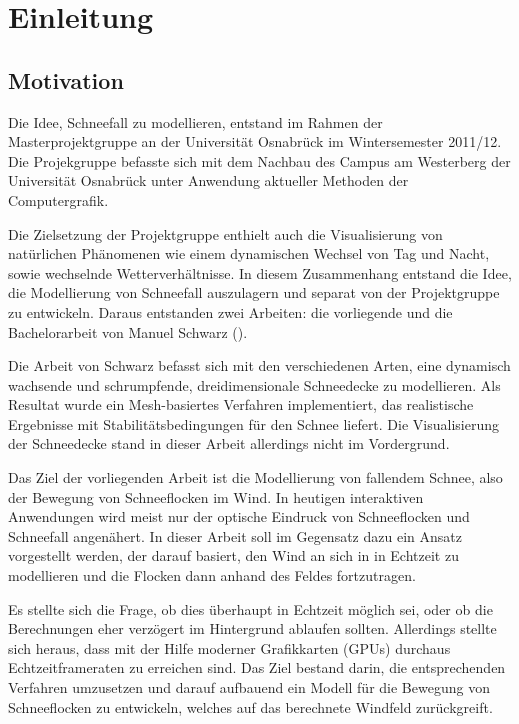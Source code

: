 \section{Einleitung}

\subsection{Motivation}

Die Idee, Schneefall zu modellieren, entstand im Rahmen der
Masterprojektgruppe  an der
Universität Osnabrück im Wintersemester 2011/12. Die Projekgruppe
befasste sich mit dem Nachbau des Campus am Westerberg der Universität
Osnabrück unter Anwendung aktueller Methoden der Computergrafik.

Die Zielsetzung der Projektgruppe enthielt auch die Visualisierung von
natürlichen Phänomenen wie einem dynamischen Wechsel von Tag und
Nacht, sowie wechselnde Wetterverhältnisse. In diesem Zusammenhang
entstand die Idee, die Modellierung von Schneefall auszulagern und
separat von der Projektgruppe zu entwickeln. Daraus entstanden zwei
Arbeiten: die vorliegende und die Bachelorarbeit von Manuel Schwarz
(\cite{Schwarz2012}).

Die Arbeit von Schwarz befasst sich mit den verschiedenen Arten, eine
dynamisch wachsende und schrumpfende, dreidimensionale Schneedecke zu
modellieren. Als Resultat wurde ein Mesh-basiertes Verfahren
implementiert, das realistische Ergebnisse mit Stabilitätsbedingungen
für den Schnee liefert. Die Visualisierung der Schneedecke stand in
dieser Arbeit allerdings nicht im Vordergrund.

Das Ziel der vorliegenden Arbeit ist die Modellierung von fallendem
Schnee, also der Bewegung von Schneeflocken im Wind. In heutigen
interaktiven Anwendungen wird meist nur der optische Eindruck von
Schneeflocken und Schneefall angenähert. In dieser Arbeit soll im
Gegensatz dazu ein Ansatz vorgestellt werden, der darauf basiert, den
Wind an sich in in Echtzeit zu modellieren und die Flocken dann anhand
des Feldes fortzutragen.

Es stellte sich die Frage, ob dies überhaupt in Echtzeit möglich sei,
oder ob die Berechnungen eher verzögert im Hintergrund ablaufen
sollten. Allerdings stellte sich heraus, dass mit der Hilfe moderner
Grafikkarten (GPUs) durchaus Echtzeitframeraten zu erreichen sind. Das
Ziel bestand darin, die entsprechenden Verfahren umzusetzen und darauf
aufbauend ein Modell für die Bewegung von Schneeflocken zu entwickeln,
welches auf das berechnete Windfeld zurückgreift.

